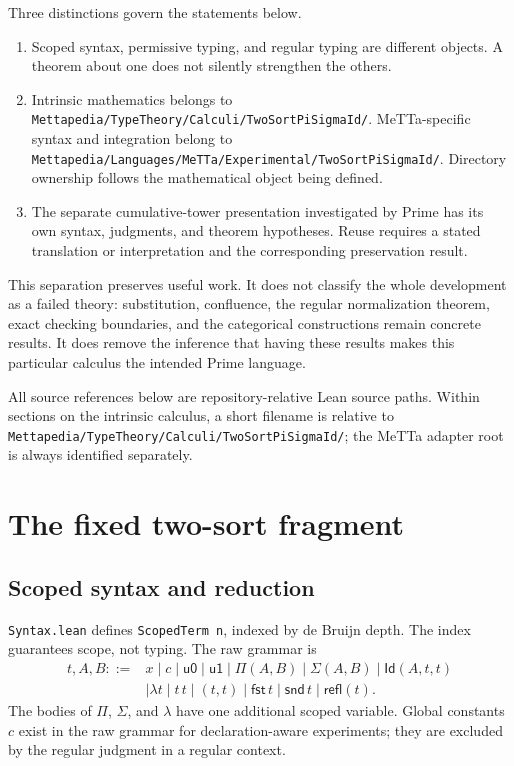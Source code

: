 \documentclass[11pt]{article}
\newcommand{\code}[1]{\nolinkurl{#1}}
\newcommand{\uZ}{\mathsf{u0}}
\newcommand{\uO}{\mathsf{u1}}
\newcommand{\Id}{\mathsf{Id}}
\newcommand{\refl}{\mathsf{refl}}
\begin{document}
Three distinctions govern the statements below.
\begin{enumerate}[nosep]
  \item Scoped syntax, permissive typing, and regular typing are different
  objects. A theorem about one does not silently strengthen the others.
  \item Intrinsic mathematics belongs to
  \code{Mettapedia/TypeTheory/Calculi/TwoSortPiSigmaId/}.
  MeTTa-specific syntax and integration belong to
  \code{Mettapedia/Languages/MeTTa/Experimental/TwoSortPiSigmaId/}.
  Directory ownership follows the mathematical object being defined.
  \item The separate cumulative-tower presentation investigated by Prime has
  its own syntax, judgments, and theorem hypotheses. Reuse requires a stated
  translation or interpretation and the corresponding preservation result.
\end{enumerate}

This separation preserves useful work. It does not classify the whole
development as a failed theory: substitution, confluence, the regular
normalization theorem, exact checking boundaries, and the categorical
constructions remain concrete results. It does remove the inference that
having these results makes this particular calculus the intended Prime
language.

All source references below are repository-relative Lean source paths.
Within sections on the intrinsic calculus, a short filename is relative to
\code{Mettapedia/TypeTheory/Calculi/TwoSortPiSigmaId/}; the MeTTa adapter root is
always identified separately.

\section{The fixed two-sort fragment}
\label{sec:calculus}

\subsection{Scoped syntax and reduction}

\code{Syntax.lean} defines \code{ScopedTerm n}, indexed by de Bruijn depth.
The index guarantees scope, not typing. The raw grammar is
\[
\begin{aligned}
 t,A,B ::= {}& x \mid c \mid \uZ \mid \uO
       \mid \Pi(A,B) \mid \Sigma(A,B) \mid \Id(A,t,t)\\
       &\mid \lambda t \mid t\,t \mid (t,t)
       \mid \mathsf{fst}\,t \mid \mathsf{snd}\,t \mid \refl(t).
\end{aligned}
\]
The bodies of $\Pi$, $\Sigma$, and $\lambda$ have one additional scoped
variable. Global constants $c$ exist in the raw grammar for declaration-aware
experiments; they are excluded by the regular judgment in a regular context.
\end{document}
